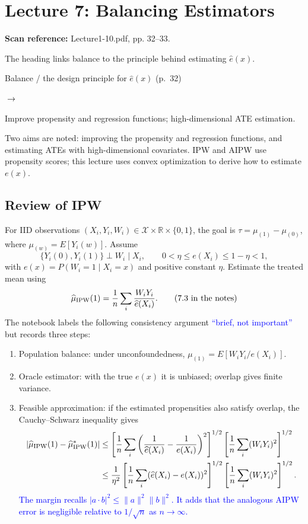 \documentclass[11pt,a4paper]{article}
\newcommand{\sourcepages}[1]{\par{\small\sffamily\color{muted}\textbf{Scan reference:} #1\par}\nobreak\smallskip\nopagebreak[4]}
\newcommand{\inkblue}[1]{\textcolor{blue}{#1}}
\newcommand{\notearrow}[3]{%
\par\Needspace{6\baselineskip}\smallskip
\noindent\begin{minipage}[c]{0.43\linewidth}\raggedright\color{#1}#2\end{minipage}%
\hfill\textcolor{#1}{\(\longrightarrow\)}\hfill%
\begin{minipage}[c]{0.43\linewidth}\raggedright#3\end{minipage}\par\smallskip}
\begin{document}
\section{Lecture 7: Balancing Estimators}
\sourcepages{Lecture1-10.pdf, pp. 32--33.}
The heading links balance to the principle behind estimating $\widehat e(x)$.
\notearrow{black}{Balance / the design principle for $\widehat e(x)$ (p.~32)}{Improve propensity and regression functions; high-dimensional ATE estimation.}
 Two aims are noted: improving the propensity and regression functions, and estimating ATEs with high-dimensional covariates. IPW and AIPW use propensity scores; this lecture uses convex optimization to derive how to estimate $e(x)$.
\subsection{Review of IPW}
For IID observations $(X_i,Y_i,W_i)\in\mathcal X\times\mathbb R\times\{0,1\}$, the goal is $\tau=\mu_{(1)}-\mu_{(0)}$, where $\mu_{(w)}=E[Y_i(w)]$. Assume
\[
\{Y_i(0),Y_i(1)\}\perp W_i\mid X_i,\qquad
0<\eta\leq e(X_i)\leq1-\eta<1,
\]
with $e(x)=P(W_i=1\mid X_i=x)$ and positive constant $\eta$. Estimate the treated mean using
\[
\widehat\mu_{\rm IPW}(1)=\frac1n\sum_i\frac{W_iY_i}{\widehat e(X_i)}.
\tag{7.3 in the notes}
\]
The notebook labels the following consistency argument \inkblue{``brief, not important''} but records three steps:
\begin{enumerate}
\item Population balance: under unconfoundedness, $\mu_{(1)}=E[W_iY_i/e(X_i)]$.
\item Oracle estimator: with the true $e(x)$ it is unbiased; overlap gives finite variance.
\item Feasible approximation: if the estimated propensities also satisfy overlap, the Cauchy--Schwarz inequality gives
\begin{align*}
|\widehat\mu_{\rm IPW}(1)-\widehat\mu^*_{\rm IPW}(1)|
&\leq\left[\frac1n\sum_i\left(\frac1{\widehat e(X_i)}-\frac1{e(X_i)}\right)^2\right]^{1/2}
\left[\frac1n\sum_i(W_iY_i)^2\right]^{1/2}\\
&\leq\frac1{\eta^2}\left[\frac1n\sum_i(\widehat e(X_i)-e(X_i))^2\right]^{1/2}
\left[\frac1n\sum_i(W_iY_i)^2\right]^{1/2}.
\end{align*}
\inkblue{The margin recalls $|a\cdot b|^2\leq\|a\|^2\|b\|^2$. It adds that the analogous AIPW error is negligible relative to $1/\sqrt n$ as $n\to\infty$.}
\end{enumerate}
\end{document}
